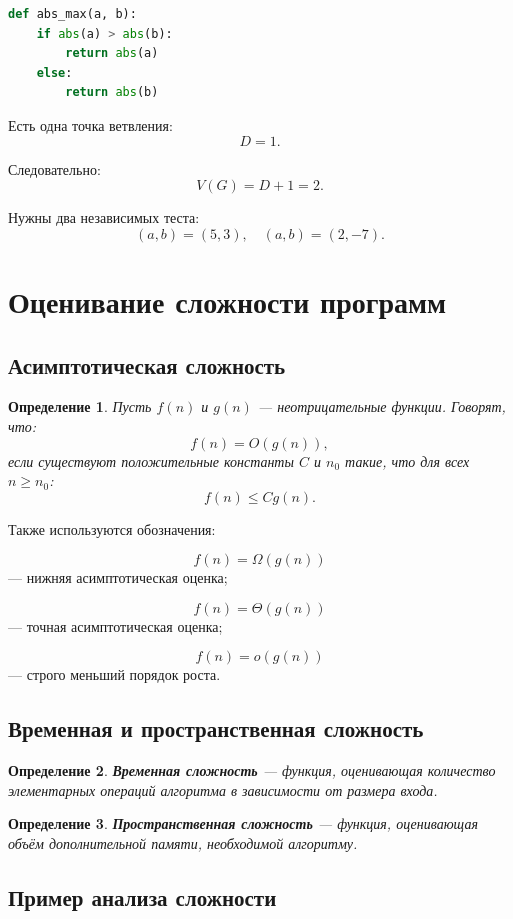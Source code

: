 \documentclass[12pt,a4paper]{article}
\newtheorem{definition}{Определение}
\begin{document}
\begin{lstlisting}[language=Python]
def abs_max(a, b):
    if abs(a) > abs(b):
        return abs(a)
    else:
        return abs(b)
\end{lstlisting}

Есть одна точка ветвления:
\[
D=1.
\]

Следовательно:
\[
V(G)=D+1=2.
\]

Нужны два независимых теста:
\[
(a,b)=(5,3),\quad (a,b)=(2,-7).
\]

\section{Оценивание сложности программ}

\subsection{Асимптотическая сложность}

\begin{definition}
Пусть $f(n)$ и $g(n)$ --- неотрицательные функции. Говорят, что:
\[
f(n)=O(g(n)),
\]
если существуют положительные константы $C$ и $n_0$ такие, что для всех $n\geq n_0$:
\[
f(n)\leq Cg(n).
\]
\end{definition}

Также используются обозначения:

\[
f(n)=\Omega(g(n))
\]
--- нижняя асимптотическая оценка;

\[
f(n)=\Theta(g(n))
\]
--- точная асимптотическая оценка;

\[
f(n)=o(g(n))
\]
--- строго меньший порядок роста.

\subsection{Временная и пространственная сложность}

\begin{definition}
\textbf{Временная сложность} --- функция, оценивающая количество элементарных операций алгоритма в зависимости от размера входа.
\end{definition}

\begin{definition}
\textbf{Пространственная сложность} --- функция, оценивающая объём дополнительной памяти, необходимой алгоритму.
\end{definition}

\subsection{Пример анализа сложности}
\end{document}
